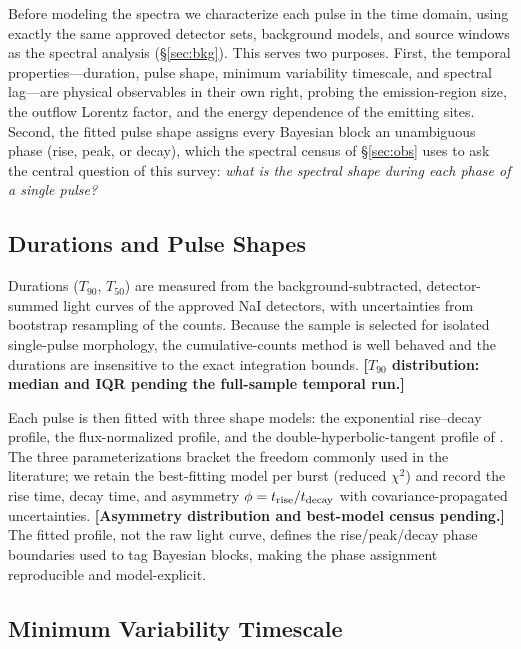 \documentclass[twocolumn]{aastex631}
\newcommand{\PHt}[1]{\textbf{[#1]}}
\begin{document}
Before modeling the spectra we characterize each pulse in the time domain,
using exactly the same approved detector sets, background models, and source
windows as the spectral analysis (\S\ref{sec:bkg}). This serves two purposes.
First, the temporal properties---duration, pulse shape, minimum variability
timescale, and spectral lag---are physical observables in their own right,
probing the emission-region size, the outflow Lorentz factor, and the energy
dependence of the emitting sites. Second, the fitted pulse shape assigns every
Bayesian block an unambiguous phase (rise, peak, or decay), which the
spectral census of \S\ref{sec:obs} uses to ask the central question of this
survey: \emph{what is the spectral shape during each phase of a single
pulse?}

\subsection{Durations and Pulse Shapes} \label{sec:durations}

Durations ($T_{90}$, $T_{50}$) are measured from the background-subtracted,
detector-summed light curves of the approved NaI detectors, with
uncertainties from bootstrap resampling of the counts. Because the sample is
selected for isolated single-pulse morphology, the cumulative-counts method
is well behaved and the durations are insensitive to the exact integration
bounds. \PHt{$T_{90}$ distribution: median and IQR pending the full-sample
temporal run.}

Each pulse is then fitted with three shape models: the
\citet{Norris2005} exponential rise--decay profile, the
\citet{Kocevski2003} flux-normalized profile, and the double-hyperbolic-tangent
profile of \citet{Gowri2025}. The three parameterizations bracket the
freedom commonly used in the literature; we retain the best-fitting model
per burst (reduced $\chi^{2}$) and record the rise time, decay time, and
asymmetry $\phi = t_{\rm rise}/t_{\rm decay}$ with covariance-propagated
uncertainties. \PHt{Asymmetry distribution and best-model census pending.}
The fitted profile, not the raw light curve, defines the rise/peak/decay
phase boundaries used to tag Bayesian blocks, making the phase assignment
reproducible and model-explicit.

\subsection{Minimum Variability Timescale} \label{sec:mvt}
\end{document}
